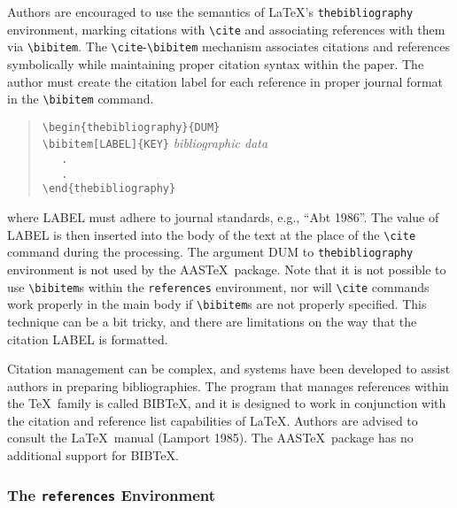 Authors are encouraged to use the semantics of \LaTeX's 
{\tt thebibliography} environment, marking citations with \verb"\cite" 
and associating references with them via \verb"\bibitem".
The \verb"\cite"-\verb"\bibitem"
mechanism associates citations and references symbolically
while maintaining proper citation syntax within the paper.
The author must create the citation label for each reference
in proper journal format in the \verb"\bibitem" command.
\begin{quote}
\verb"\begin{thebibliography}{DUM}"\\
\verb"\bibitem[LABEL]{KEY}" {\it bibliographic data\/}\\
\verb"   ."\\
\verb"   ."\\
\verb"\end{thebibliography}"
\end{quote}
where {\small LABEL} must adhere to journal standards, e.g., ``Abt 1986''.
The value of {\small LABEL} is then inserted into the body of the text
at the place of the \verb"\cite" command during the processing.
The argument {\small DUM} to {\tt thebibliography} environment is not
used by the AAS\TeX\ package.
Note that it is not possible to use \verb"\bibitem"s
within the {\tt references} environment,
nor will \verb"\cite" commands work properly in the main body
if \verb"\bibitem"s are not properly specified.
This technique can be a bit tricky, and there are limitations on the
way that the citation {\small LABEL} is formatted.

Citation management can be complex, and systems have been
developed to assist authors in preparing bibliographies.
The program that manages references within the \TeX\ family
is called BIB\TeX, and it is designed to work in conjunction
with the citation and reference list capabilities of \LaTeX.
Authors are advised to consult the \LaTeX\ manual (Lamport 1985).
The AAS\TeX\ package has no additional support for BIB\TeX\/.

\subsubsection{The {\tt references} Environment}\label{refenv}

